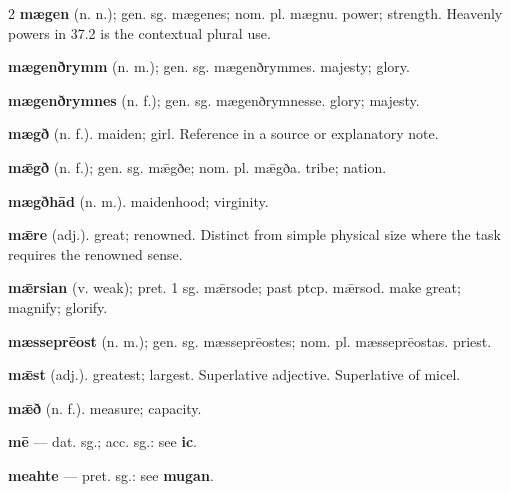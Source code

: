 \begin{multicols*}{2}
\textbf{mægen} (n. n.); gen. sg. mægenes; nom. pl. mægnu. power; strength. Heavenly powers in 37.2 is the contextual plural use.\par
\textbf{mægenðrymm} (n. m.); gen. sg. mægenðrymmes. majesty; glory.\par
\textbf{mægenðrymnes} (n. f.); gen. sg. mægenðrymnesse. glory; majesty.\par
\textbf{mægð} (n. f.). maiden; girl. Reference in a source or explanatory note.\par
\textbf{mǣgð} (n. f.); gen. sg. mǣgðe; nom. pl. mǣgða. tribe; nation.\par
\textbf{mægðhād} (n. m.). maidenhood; virginity.\par
\textbf{mǣre} (adj.). great; renowned. Distinct from simple physical size where the task requires the renowned sense.\par
\textbf{mǣrsian} (v. weak); pret. 1 sg. mǣrsode; past ptcp. mǣrsod. make great; magnify; glorify.\par
\textbf{mæsseprēost} (n. m.); gen. sg. mæsseprēostes; nom. pl. mæsseprēostas. priest.\par
\textbf{mǣst} (adj.). greatest; largest. Superlative adjective. Superlative of micel.\par
\textbf{mǣð} (n. f.). measure; capacity.\par
\textbf{mē} — dat. sg.; acc. sg.: see \textbf{ic}.\par
\textbf{meahte} — pret. sg.: see \textbf{mugan}.\par

\end{multicols*}
